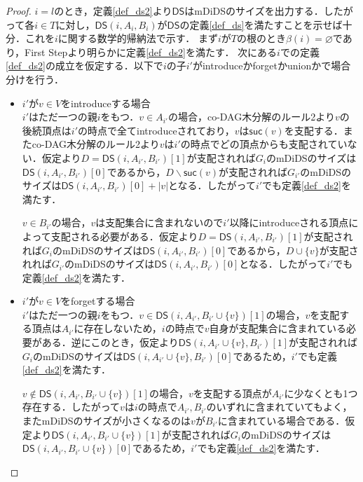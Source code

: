 \documentclass[master]{kuisthesis}		%
\theoremstyle{plain}
\theoremstyle{definition}
\begin{document}
{\begin{proof}
    $i=l$のとき，定義\ref{def_ds2}より$\mathsf{DS}$はmDiDSのサイズを出力する．したがって各$i \in T$に対し，$\mathsf{DS}(i, A_i, B_i)$が$\mathsf{DS}$の定義\ref{def_ds}を満たすことを示せば十分．これを$i$に関する数学的帰納法で示す．
    まず$i$が$T$の根のとき$\beta(i) = \varnothing$であり，First Stepより明らかに定義\ref{def_ds2}を満たす．
    次にある$i$での定義\ref{def_ds2}の成立を仮定する．以下で$i$の子$i'$がintroduceかforgetかunionかで場合分けを行う．
    \begin{itemize}
        \item $i'$が$v \in V$をintroduceする場合 \\
        $i'$はただ一つの親$i$をもつ．$v \in A_{i'}$の場合，co-DAG木分解のルール2より$v$の後続頂点は$i'$の時点で全てintroduceされており，$v$は$\mathsf{suc}(v)$を支配する．またco-DAG木分解のルール2より$v$は$i'$の時点でどの頂点からも支配されていない．仮定より$D = \mathsf{DS}(i, A_{i'}, B_{i'})[1]$が支配されれば$G_i$のmDiDSのサイズは$\mathsf{DS}(i, A_{i'}, B_{i'})[0]$であるから，$D \backslash \mathsf{suc}(v)$が支配されれば$G_{i'}$のmDiDSのサイズは$\mathsf{DS}(i, A_{i'}, B_{i'})[0] + |v|$となる．したがって$i'$でも定義\ref{def_ds2}を満たす．

        $v \in B_{i'}$の場合，$v$は支配集合に含まれないので$i'$以降にintroduceされる頂点によって支配される必要がある．仮定より$D = \mathsf{DS}(i, A_{i'}, B_{i'})[1]$が支配されれば$G_i$のmDiDSのサイズは$\mathsf{DS}(i, A_{i'}, B_{i'})[0]$であるから，$D \cup \{v\}$が支配されれば$G_{i'}$のmDiDSのサイズは$\mathsf{DS}(i, A_{i'}, B_{i'})[0]$となる．したがって$i'$でも定義\ref{def_ds2}を満たす．
        
        \item $i'$が$v \in V$をforgetする場合 \\
        $i'$はただ一つの親$i$をもつ．$v \in \mathsf{DS}(i, A_{i'}, B_{i'} \cup \{v\})[1]$の場合，$v$を支配する頂点は$A_{i'}$に存在しないため，$i$の時点で$v$自身が支配集合に含まれている必要がある．逆にこのとき，仮定より$\mathsf{DS}(i, A_{i'} \cup \{v\}, B_{i'})[1]$が支配されれば$G_i$のmDiDSのサイズは$\mathsf{DS}(i, A_{i'} \cup \{v\}, B_{i'})[0]$であるため，$i'$でも定義\ref{def_ds2}を満たす．

        $v \notin \mathsf{DS}(i, A_{i'}, B_{i'} \cup \{v\})[1]$の場合，$v$を支配する頂点が$A_{i'}$に少なくとも1つ存在する．したがって$v$は$i$の時点で$A_{i'}, B_{i'}$のいずれに含まれていてもよく，またmDiDSのサイズが小さくなるのは$v$が$B_{i'}$に含まれている場合である．仮定より$\mathsf{DS}(i, A_{i'}, B_{i'} \cup \{v\})[1]$が支配されれば$G_i$のmDiDSのサイズは$\mathsf{DS}(i, A_{i'}, B_{i'} \cup \{v\})[0]$であるため，$i'$でも定義\ref{def_ds2}を満たす．


\end{itemize}
\end{proof}}
\end{document}
